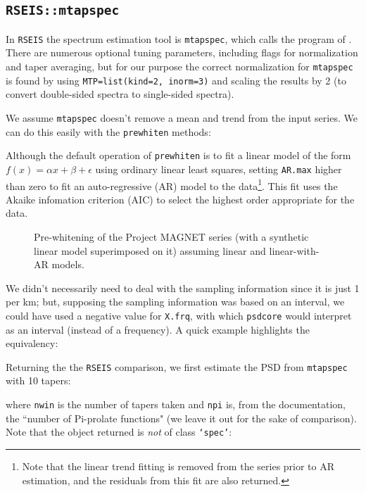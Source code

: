 \documentclass[10pt]{article}\usepackage[]{graphicx}\usepackage[]{color}
\newcommand{\Rcmd}[1]{\texttt{#1}}
\begin{document}
\clearpage

\subsection{\Rcmd{RSEIS::mtapspec}}

In \Rcmd{RSEIS} the spectrum estimation tool is \Rcmd{mtapspec}, which
calls the program of \citet{lees1995}.
There are numerous optional tuning parameters, including
flags for normalization and taper averaging, but 
for our purpose the correct normalization for \Rcmd{mtapspec} is found
by using \Rcmd{MTP=list(kind=2, inorm=3)} and scaling the results by 2 (to convert
double-sided spectra to single-sided spectra).

We assume \Rcmd{mtapspec} doesn't remove a mean and trend from the
input series.  We can do this easily with the \Rcmd{prewhiten} methods:


Although the default operation of  \Rcmd{prewhiten} is to fit a linear model of the form 
$f(x) = \alpha x + \beta + \epsilon$ using ordinary linear least squares,
setting \Rcmd{AR.max} higher than zero to fit an auto-regressive (AR) model to the 
data\footnote{Note that the linear trend fitting is removed from the series prior to AR estimation,
and the residuals from this fit are also returned.}.  
This fit uses the Akaike infomation criterion (AIC) to select
the highest order appropriate for the data.


\label{sxn:prew}

\begin{figure}[!htbp]
\begin{center}

\caption{Pre-whitening of the Project MAGNET series (with a
synthetic linear model superimposed on it) assuming linear and linear-with-AR models.
}
\label{fig:magd}
\end{center}
\end{figure}

\clearpage

We didn't necessarily need to deal with the sampling information since it is just 1 per km;
but, supposing the sampling information was based on an interval, we could have used
a negative value for \Rcmd{X.frq}, with which \Rcmd{psdcore}
would interpret as an interval (instead of a frequency). 
A quick example highlights the equivalency:


Returning the the \Rcmd{RSEIS} comparison, we first 
estimate the PSD from \Rcmd{mtapspec} with 10 tapers:

where \Rcmd{nwin} is the number of tapers taken and
\Rcmd{npi} is, from the documentation, the ``number of Pi-prolate functions" (we
leave it out for the sake of comparison). Note that the object returned
is \emph{not} of class \Rcmd{`spec'}:

\end{document}
